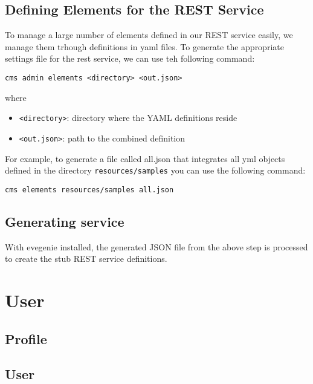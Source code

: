 \documentclass[9pt,twocolumn,twoside]{styles/osajnl}
\begin{document}
\subsection{Defining Elements for the REST Service}

To manage a large number of elements defined in our REST service
easily, we manage them trhough definitions in yaml files. To generate
the appropriate settings file for the rest service, we can use teh
following command:

\begin{verbatim}
cms admin elements <directory> <out.json>
\end{verbatim}

where

\begin{itemize}
\item \verb+<directory>+: directory where the YAML definitions reside
\item \verb+<out.json>+: path to the combined definition
\end{itemize}

For example, to generate a file called all.json that integrates all
yml objects defined in the directory \verb+resources/samples+ you can
use the following command:

\begin{verbatim}
cms elements resources/samples all.json
\end{verbatim}


\subsection{Generating service}

With evegenie installed, the generated JSON file from the above step
is processed to create the stub REST service definitions.


\section{User}

\subsection{Profile}



\subsection{User}
\end{document}
